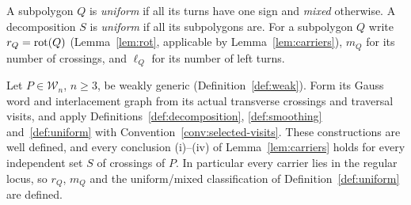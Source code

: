 \begin{definition}\label{def:uniform}
A subpolygon $Q$ is \emph{uniform} if all its turns have one sign and
\emph{mixed} otherwise. A decomposition $S$ is \emph{uniform} if all its
subpolygons are. For a subpolygon $Q$ write $r_Q=\operatorname{rot}(Q)$
(Lemma~\ref{lem:rot}, applicable by Lemma~\ref{lem:carriers}), $m_Q$ for its
number of crossings, and $\ell_Q$ for its number of left turns.
\end{definition}

\begin{lemma}\label{lem:weak-carriers}
Let $P\in\mathcal W_n$, $n\geq3$, be weakly generic
(Definition~\ref{def:weak}). Form its Gauss word and interlacement graph
from its actual transverse crossings and traversal visits, and apply
Definitions~\ref{def:decomposition}, \ref{def:smoothing}
and~\ref{def:uniform} with Convention~\ref{conv:selected-visits}. These
constructions are well defined, and every conclusion (i)--(iv) of
Lemma~\ref{lem:carriers} holds for every independent set $S$ of crossings
of $P$. In particular every carrier lies in the regular locus, so $r_Q$,
$m_Q$ and the uniform/mixed classification of Definition~\ref{def:uniform}
are defined.
\end{lemma}
